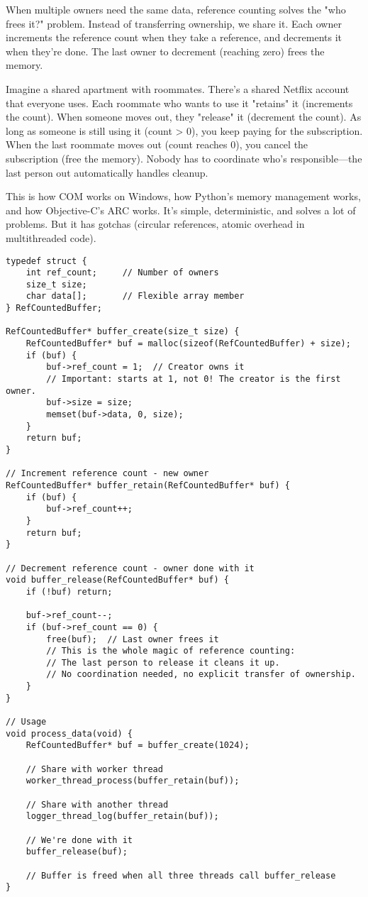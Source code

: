 When multiple owners need the same data, reference counting solves the "who frees it?" problem. Instead of transferring ownership, we share it. Each owner increments the reference count when they take a reference, and decrements it when they're done. The last owner to decrement (reaching zero) frees the memory.

Imagine a shared apartment with roommates. There's a shared Netflix account that everyone uses. Each roommate who wants to use it "retains" it (increments the count). When someone moves out, they "release" it (decrement the count). As long as someone is still using it (count > 0), you keep paying for the subscription. When the last roommate moves out (count reaches 0), you cancel the subscription (free the memory). Nobody has to coordinate who's responsible---the last person out automatically handles cleanup.

This is how COM works on Windows, how Python's memory management works, and how Objective-C's ARC works. It's simple, deterministic, and solves a lot of problems. But it has gotchas (circular references, atomic overhead in multithreaded code).

\begin{lstlisting}
typedef struct {
    int ref_count;     // Number of owners
    size_t size;
    char data[];       // Flexible array member
} RefCountedBuffer;

RefCountedBuffer* buffer_create(size_t size) {
    RefCountedBuffer* buf = malloc(sizeof(RefCountedBuffer) + size);
    if (buf) {
        buf->ref_count = 1;  // Creator owns it
        // Important: starts at 1, not 0! The creator is the first owner.
        buf->size = size;
        memset(buf->data, 0, size);
    }
    return buf;
}

// Increment reference count - new owner
RefCountedBuffer* buffer_retain(RefCountedBuffer* buf) {
    if (buf) {
        buf->ref_count++;
    }
    return buf;
}

// Decrement reference count - owner done with it
void buffer_release(RefCountedBuffer* buf) {
    if (!buf) return;

    buf->ref_count--;
    if (buf->ref_count == 0) {
        free(buf);  // Last owner frees it
        // This is the whole magic of reference counting:
        // The last person to release it cleans it up.
        // No coordination needed, no explicit transfer of ownership.
    }
}

// Usage
void process_data(void) {
    RefCountedBuffer* buf = buffer_create(1024);

    // Share with worker thread
    worker_thread_process(buffer_retain(buf));

    // Share with another thread
    logger_thread_log(buffer_retain(buf));

    // We're done with it
    buffer_release(buf);

    // Buffer is freed when all three threads call buffer_release
}
\end{lstlisting}

